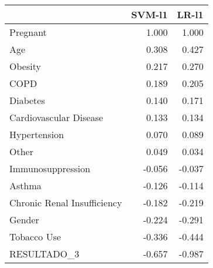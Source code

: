 \begin{tabular}{lrr}
\toprule
{} &  SVM-l1 &  LR-l1 \\
\midrule
Pregnant                    &   1.000 &  1.000 \\
Age                         &   0.308 &  0.427 \\
Obesity                     &   0.217 &  0.270 \\
COPD                        &   0.189 &  0.205 \\
Diabetes                    &   0.140 &  0.171 \\
Cardiovascular Disease      &   0.133 &  0.134 \\
Hypertension                &   0.070 &  0.089 \\
Other                       &   0.049 &  0.034 \\
Immunosuppression           &  -0.056 & -0.037 \\
Asthma                      &  -0.126 & -0.114 \\
Chronic Renal Insufficiency &  -0.182 & -0.219 \\
Gender                      &  -0.224 & -0.291 \\
Tobacco Use                 &  -0.336 & -0.444 \\
RESULTADO\_3                 &  -0.657 & -0.987 \\
\bottomrule
\end{tabular}
